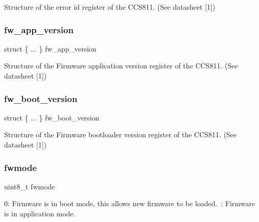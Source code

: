 Structure of the error id register of the C\+C\+S811. (See datasheet \mbox{[}1\mbox{]}) 

\mbox{\label{union_application_register_aa0aac4d3d600c35642cf00e4953d143f}} 
\subsubsection{\texorpdfstring{fw\+\_\+app\+\_\+version}{fw\_app\_version}}
{\footnotesize\ttfamily struct \{ ... \}   fw\+\_\+app\+\_\+version}



Structure of the Firmware application version register of the C\+C\+S811. (See datasheet \mbox{[}1\mbox{]}) 

\mbox{\label{union_application_register_acacf81aec22cc311505f2c2e8363e55f}} 
\subsubsection{\texorpdfstring{fw\+\_\+boot\+\_\+version}{fw\_boot\_version}}
{\footnotesize\ttfamily struct \{ ... \}   fw\+\_\+boot\+\_\+version}



Structure of the Firmware bootloader version register of the C\+C\+S811. (See datasheet \mbox{[}1\mbox{]}) 

\mbox{\label{union_application_register_aacc84f0d7fba3fd77eff42c1963ece89}} 
\subsubsection{\texorpdfstring{fwmode}{fwmode}}
{\footnotesize\ttfamily uint8\+\_\+t fwmode}



0\+: Firmware is in boot mode, this allows new firmware to be loaded.~\+: Firmware is in application mode. 


